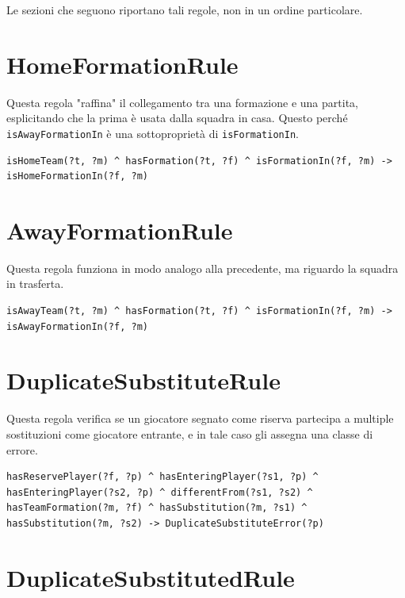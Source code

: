 \documentclass[11pt]{report} %
\begin{document}
\begin{itemize}[leftmargin=*]
Le sezioni che seguono riportano tali regole, non in un ordine particolare.

\section{HomeFormationRule}

Questa regola "raffina" il collegamento tra una formazione e una partita, esplicitando che la prima è usata dalla squadra in casa.
Questo perché \texttt{isAwayFormationIn} è una sottoproprietà di \texttt{isFormationIn}.

\begin{lstlisting}[language=SWRL]
isHomeTeam(?t, ?m) ^ hasFormation(?t, ?f) ^ isFormationIn(?f, ?m) -> isHomeFormationIn(?f, ?m)
\end{lstlisting}

\section{AwayFormationRule}

Questa regola funziona in modo analogo alla precedente, ma riguardo la squadra in trasferta.

\begin{lstlisting}[language=SWRL]
isAwayTeam(?t, ?m) ^ hasFormation(?t, ?f) ^ isFormationIn(?f, ?m) -> isAwayFormationIn(?f, ?m)
\end{lstlisting}

\newpage

\section{DuplicateSubstituteRule}

Questa regola verifica se un giocatore segnato come riserva partecipa a multiple sostituzioni come giocatore entrante, e in tale caso gli assegna una classe di errore.

\begin{lstlisting}[language=SWRL]
hasReservePlayer(?f, ?p) ^ hasEnteringPlayer(?s1, ?p) ^ hasEnteringPlayer(?s2, ?p) ^ differentFrom(?s1, ?s2) ^ hasTeamFormation(?m, ?f) ^ hasSubstitution(?m, ?s1) ^ hasSubstitution(?m, ?s2) -> DuplicateSubstituteError(?p)
\end{lstlisting}

\section{DuplicateSubstitutedRule}


\end{itemize}
\end{document}
